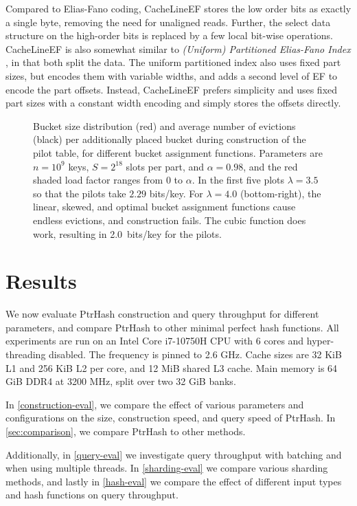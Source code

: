 \documentclass[a4paper,UKenglish,cleveref,thm-restate]{lipics-v2021}
\begin{document}
Compared to Elias-Fano coding, CacheLineEF stores the low order bits as exactly
a single byte, removing the need for unaligned reads. Further, the select
data structure on the high-order bits is replaced by a few local bit-wise operations.
CacheLineEF is also somewhat similar to \emph{(Uniform) Partitioned Elias-Fano Index}
\cite{partitioned-elias-fano}, in that both split the data.
The uniform partitioned index also uses fixed part sizes, but encodes them with
variable widths, and adds a second level of EF
to encode the part offsets. Instead, CacheLineEF prefers simplicity and uses
fixed part sizes with a constant width encoding and simply stores the offsets directly.

\begin{figure}[t]
\centering

\caption{\label{bucket-fn-plot}Bucket size distribution (red) and average number of evictions (black) per additionally placed bucket during construction of the pilot table, for different bucket assignment functions. Parameters are \(n=10^9\) keys, \(S=2^{18}\) slots per part, and \(\alpha=0.98\), and the red shaded load factor ranges from 0 to \(\alpha\). In the first five plots \(\lambda=3.5\) so that the pilots take \(2.29\) bits/key. For \(\lambda=4.0\) (bottom-right), the linear, skewed, and optimal bucket assignment functions cause endless evictions, and construction fails. The cubic function does work, resulting in 2.0~bits/key for the pilots.}
\end{figure}



\section{Results}
\label{sec:org283efff}
We now evaluate PtrHash construction and query throughput for
different parameters, and compare PtrHash to other minimal perfect hash functions.
All experiments are run on an Intel Core i7-10750H CPU with 6 cores and
hyper-threading disabled.
The frequency is pinned to 2.6 GHz.
Cache sizes are 32 KiB L1 and 256 KiB L2 per core, and 12 MiB shared L3 cache. Main
memory is 64 GiB DDR4 at 3200 MHz, split over two 32 GiB banks.

In \cref{construction-eval}, we compare the effect of various parameters and
configurations on the size, construction speed, and query speed of PtrHash.
In \cref{sec:comparison}, we compare PtrHash to other methods.

Additionally, in \cref{query-eval} we investigate query throughput with
batching and when using multiple threads. In \cref{sharding-eval} we
compare various sharding methods, and lastly in \cref{hash-eval} we compare the effect
of different input types and hash functions on query throughput.
\end{document}
